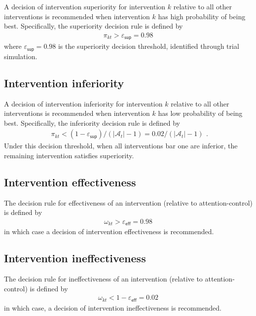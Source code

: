 \documentclass[
]{article}
\begin{document}
A decision of intervention superiority for intervention $k$ relative to all other interventions is recommended when intervention $k$ has high probability of being best.
Specifically, the superiority decision rule is defined by
$$
  \begin{aligned}
    \pi_{kt} > \varepsilon_{\mathsf{sup}} = 0.98
  \end{aligned}
$$
where $\varepsilon_{\mathsf{sup}} = 0.98$ is the superiority decision threshold, identified through trial simulation.

\hypertarget{intervention-inferiority}{%
  \subsection{Intervention inferiority}\label{trinterventioneatment-inferiority}}

A decision of intervention inferiority for intervention $k$ relative to all other interventions is recommended when intervention $k$ has low probability of being best.
Specifically, the inferiority decision rule is defined by
$$
  \begin{aligned}
    \pi_{kt} < (1 - \varepsilon_{\mathsf{sup}}) / (|\mathcal{A}_t| - 1) = 0.02 / (|\mathcal{A}_t| - 1)
  \end{aligned}.
$$
Under this decision threshold, when all interventions bar one are inferior, the remaining intervention satisfies superiority.

\hypertarget{intervention-effectiveness}{%
  \subsection{Intervention effectiveness}\label{intervention-effectiveness}}

The decision rule for effectiveness of an intervention (relative to attention-control) is defined by
$$
  \begin{aligned}
    \omega_{kt} > \varepsilon_{\mathsf{eff}} = 0.98
  \end{aligned}
$$
in which case a decision of intervention effectiveness is recommended.

\hypertarget{intervention-ineffectiveness}{%
  \subsection{Intervention ineffectiveness}\label{intervention-ineffectiveness}}

The decision rule for ineffectiveness of an intervention (relative to attention-control) is defined by
$$
  \begin{aligned}
    \omega_{kt} < 1 - \varepsilon_{\mathsf{eff}} = 0.02
  \end{aligned}
$$
in which case, a decision of intervention ineffectiveness is recommended.
\end{document}
